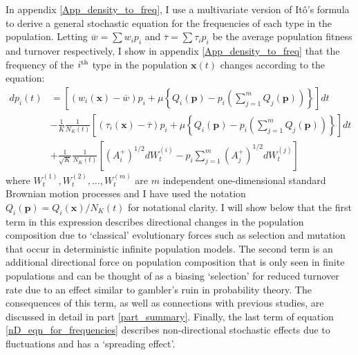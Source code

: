 In appendix \ref{App_density_to_freq}, I use a multivariate version of It\^{o}'s formula to derive a general stochastic equation for the frequencies of each type in the population. Letting $\overline{w} = \sum w_ip_i$ and $\overline{\tau} = \sum \tau_i p_i$ be the average population fitness and turnover respectively, I show in appendix \ref{App_density_to_freq} that the frequency of the $i\textsuperscript{th}$ type in the population $\mathbf{x}(t)$ changes according to the equation:
\begin{equation}
\label{nD_eqn_for_frequencies}
\begin{aligned}
dp_i(t) &= \left[(w_i(\mathbf{x}) - \overline{w})p_i + \mu\left\{Q_i(\mathbf{p}) - p_i\left(\sum\limits_{j=1}^{m}Q_j(\mathbf{p})\right)\right\}\right]dt\\
&- \frac{1}{K}\frac{1}{N_{K}(t)}\left[(\tau_i(\mathbf{x}) - \overline{\tau})p_i + \mu\left\{Q_i(\mathbf{p}) - p_i\left(\sum\limits_{j=1}^{m}Q_j(\mathbf{p})\right)\right\}\right]dt\\
&+ \frac{1}{\sqrt{K}}\frac{1}{N_{K}(t)}\left[\left(A^{+}_{i}\right)^{1/2}dW^{(i)}_t - p_i\sum\limits_{j=1}^{m}\left(A^{+}_{j}\right)^{1/2}dW^{(j)}_t\right]
\end{aligned}
\end{equation}
where $W^{(1)}_t,W^{(2)}_t, \ldots, W^{(m)}_t$ are $m$ independent one-dimensional standard Brownian motion processes and I have used the notation $Q_i(\mathbf{p}) = Q_i(\mathbf{x})/N_K(t)$ for notational clarity. I will show below that the first term in this expression describes directional changes in the population composition due to `classical' evolutionary forces such as selection and mutation that occur in deterministic infinite population models. The second term is an additional directional force on population composition that is only seen in finite populations and can be thought of as a biasing `selection' for reduced turnover rate due to an effect similar to gambler's ruin in probability theory. The consequences of this term, as well as connections with previous studies, are discussed in detail in part \ref{part_summary}. Finally, the last term of equation \eqref{nD_eqn_for_frequencies} describes non-directional stochastic effects due to fluctuations and has a `spreading effect'.

